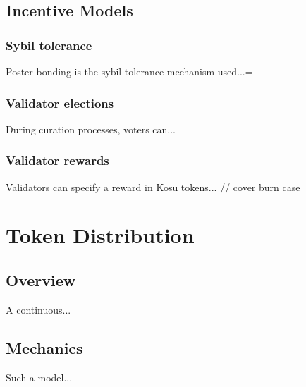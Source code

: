 \documentclass[10pt]{article}
\begin{document}
\subsection{Incentive Models}\label{incentive-models}

\subsubsection{Sybil tolerance}\label{incentive-models-sybil}
Poster bonding is the sybil tolerance mechanism used...=

\subsubsection{Validator elections}\label{incentive-models-val-elections}
During curation processes, voters can...

\subsubsection{Validator rewards}\label{incentive-models-val-rewards}
Validators can specify a reward in Kosu tokens... // cover burn case

\clearpage
\pagebreak


\section{Token Distribution}\label{token-distribution}

\subsection{Overview}\label{token-distribution-overview}
A continuous...

\subsection{Mechanics}\label{token-distribution-mechanics}
Such a model...
\end{document}

